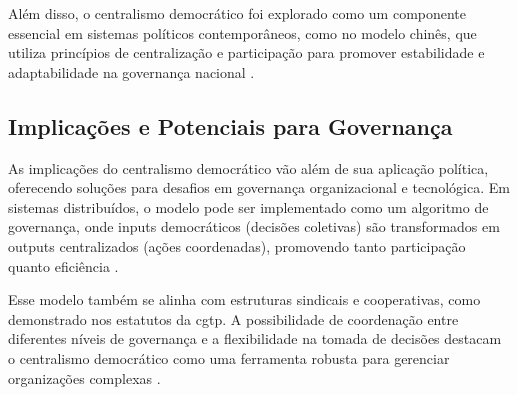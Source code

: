 Além disso, o centralismo democrático foi explorado como um componente
essencial em sistemas políticos contemporâneos, como no modelo chinês, que
utiliza princípios de centralização e participação para promover
estabilidade e adaptabilidade na governança nacional
\cite{StillaCenturyoftheChineseModel}.

\subsection{Implicações e Potenciais para Governança}
\label{sec:implicacoes_potenciais}

As implicações do centralismo democrático vão além de sua aplicação
política, oferecendo soluções para desafios em governança organizacional e
tecnológica. Em sistemas distribuídos, o modelo pode ser implementado como
um algoritmo de governança, onde inputs democráticos (decisões coletivas)
são transformados em outputs centralizados (ações coordenadas), promovendo
tanto participação quanto eficiência \cite{DoArtifactsHavePolitics}.

Esse modelo também se alinha com estruturas sindicais e cooperativas, como
demonstrado nos estatutos da \gls{cgtp}. A possibilidade de coordenação entre
diferentes níveis de governança e a flexibilidade na tomada de decisões
destacam o centralismo democrático como uma ferramenta robusta para
gerenciar organizações complexas \cite{CGTPStatutes}.
